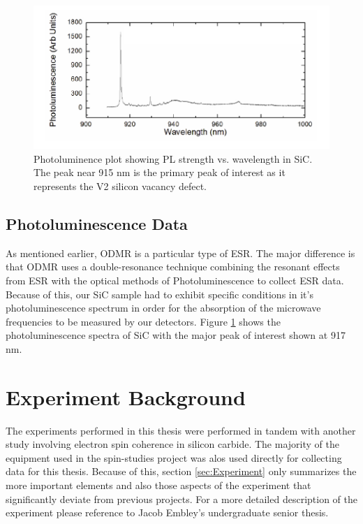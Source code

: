 \documentclass[oneside, noacknowlegments]{BYUPhys}
\begin{document}
\begin{figure}
    \centerline{\includegraphics{sic_pl_fig}}
    \caption[Photoluminence Spectra of Silicon Carbide]{\label{fig:SiCPL}
      Photoluminence plot showing PL strength vs. wavelength in SiC. The peak near 915 nm is the primary peak of interest as it represents the V2 silicon vacancy defect.}
 \end{figure}

\subsection{Photoluminescence Data}

As mentioned earlier, ODMR is a particular type of ESR. The major difference is that ODMR uses a double-resonance technique combining the resonant effects from ESR with the optical methods of Photoluminescence to collect ESR data. Because of this, our SiC sample had to exhibit specific conditions in it's photoluminescence spectrum in order for the absorption of the microwave frequencies to be measured by our detectors. Figure \ref{fig:SiCPL} shows the photoluminescence spectra of SiC with the major peak of interest shown at 917 nm.

\section{Experiment Background}

The experiments performed in this thesis were performed in tandem with another study involving electron spin coherence in silicon carbide. The majority of the equipment used in the spin-studies project was alos used directly for collecting data for this thesis. Because of this, section \ref{sec:Experiment} only summarizes the more important elements and also those aspects of the experiment that significantly deviate from previous projects. For a more detailed description of the experiment please reference to Jacob Embley's undergraduate senior thesis. \cite{RefWorks:doc:5892912ae4b0dec22aee3993}
\end{document}
